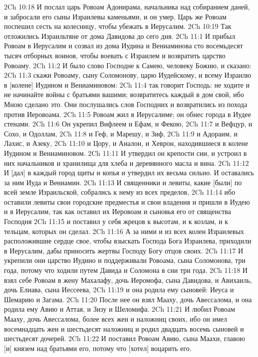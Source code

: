 2Ch 10:18  И послал царь Ровоам Адонирама, начальника над собиранием даней, и забросали его сыны Израилевы каменьями, и он умер. Царь же Ровоам поспешил сесть на колесницу, чтобы убежать в Иерусалим.
2Ch 10:19  Так отложились Израильтяне от дома Давидова до сего дня.
2Ch 11:1  И прибыл Ровоам в Иерусалим и созвал из дома Иудина и Вениаминова сто восемьдесят тысяч отборных воинов, чтобы воевать с Израилем и возвратить царство Ровоаму.
2Ch 11:2  И было слово Господне к Самею, человеку Божию, и сказано:
2Ch 11:3  скажи Ровоаму, сыну Соломонову, царю Иудейскому, и всему Израилю в [колене] Иудином и Вениаминовом:
2Ch 11:4  так говорит Господь: не ходите и не начинайте войны с братьями вашими; возвратитесь каждый в дом свой, ибо Мною сделано это. Они послушались слов Господних и возвратились из похода против Иеровоама.
2Ch 11:5  Ровоам жил в Иерусалиме; он обнес города в Иудее стенами.
2Ch 11:6  Он укрепил Вифлеем и Ефам, и Фекою,
2Ch 11:7  и Вефцур, и Сохо, и Одоллам,
2Ch 11:8  и Геф, и Марешу, и Зиф,
2Ch 11:9  и Адораим, и Лахис, и Азеку,
2Ch 11:10  и Цору, и Аиалон, и Хеврон, находившиеся в колене Иудином и Вениаминовом.
2Ch 11:11  И утвердил он крепости сии, и устроил в них начальников и хранилища для хлеба и деревянного масла и вина.
2Ch 11:12  И [дал] в каждый город щиты и копья и утвердил их весьма сильно. И оставались за ним Иуда и Вениамин.
2Ch 11:13  И священники и левиты, какие [были] по всей земле Израильской, собрались к нему из всех пределов,
2Ch 11:14  ибо оставили левиты свои городские предместья и свои владения и пришли в Иудею и в Иерусалим, так как оставил их Иеровоам и сыновья его от священства Господня
2Ch 11:15  и поставил у себя жрецов к высотам, и к козлам, и к тельцам, которых он сделал.
2Ch 11:16  А за ними и из всех колен Израилевых расположившие сердце свое, чтобы взыскать Господа Бога Израилева, приходили в Иерусалим, дабы приносить жертвы Господу Богу отцов своих.
2Ch 11:17  И укрепили они царство Иудино и поддерживали Ровоама, сына Соломонова, три года, потому что ходили путем Давида и Соломона в сии три года.
2Ch 11:18  И взял себе Ровоам в жену Махалафу, дочь Иеромофа, сына Давидова, и Авихаиль, дочь Елиава, сына Иессеева,
2Ch 11:19  и она родила ему сыновей: Иеуса и Шемарию и Загама.
2Ch 11:20  После нее он взял Мааху, дочь Авессалома, и она родила ему Авию и Аттая, и Зизу и Шеломифа.
2Ch 11:21  И любил Ровоам Мааху, дочь Авессалома, более всех жен и наложниц своих, ибо он имел восемнадцать жен и шестьдесят наложниц и родил двадцать восемь сыновей и шестьдесят дочерей.
2Ch 11:22  И поставил Ровоам Авию, сына Маахи, главою [и] князем над братьями его, потому что [хотел] воцарить его.
